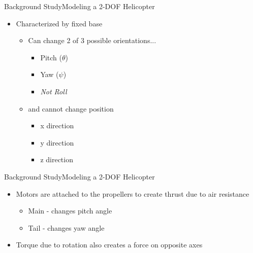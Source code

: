 \documentclass{beamer}
\begin{document}
\begin{frame}{Background Study}{Modeling a 2-DOF Helicopter}
    \begin{itemize}
        \item Characterized by fixed base
        \begin{itemize}
            \item Can change 2 of 3 possible orientations...
            \begin{itemize}
                \item Pitch ($\theta$)
                \item Yaw ($\psi$)
                \item \emph{Not Roll}
            \end{itemize}
            \item and cannot change position
            \begin{itemize}
                \item x direction
                \item y direction
                \item z direction
            \end{itemize}
        \end{itemize} 
    \end{itemize}
\end{frame}



\begin{frame}{Background Study}{Modeling a 2-DOF Helicopter}
    \begin{itemize}
        \item Motors are attached to the propellers to create thrust due to air resistance
            \begin{itemize}
                \item Main - changes pitch angle
                \item Tail - changes yaw angle
            \end{itemize} 
        \item Torque due to rotation also creates a force on opposite axes 
    \end{itemize}
\end{frame}
\end{document}
